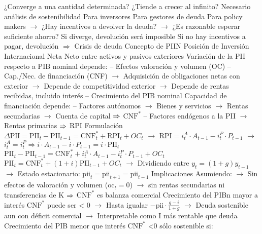 \documentclass{nuevotema}
\begin{document}
\begin{esquemal}
				\4[] ¿Converge a una cantidad determinada?
				\4[] ¿Tiende a crecer al infinito?
				\4 Necesario análisis de sostenibilidad
				\4[] Para inversores
				\4[] Para gestores de deuda
				\4[] Para policy makers
				\4[] $\to$ ¿Hay incentivos a devolver la deuda?
				\4[] $\to$ ¿Es razonable esperar suficiente ahorro?
				\4[] Si diverge, devolución será imposible
				\4[] Si no hay incentivos a pagar, devolución
				\4[] $\Rightarrow$ Crisis de deuda
				\4 Concepto de PIIN
				\4[] Posición de Inversión Internacional Neta
				\4[] Neto entre activos y pasivos exteriores
				\4 Variación de la PII respecto a PIB nominal depende:
				\4[] -- Efectos valoración y volumen (OC)
				\4[] -- Cap./Nec. de financiación (CNF)
				\4[] $\to$ Adquisición de obligaciones netas con exterior
				\4[] $\to$ Depende de competitividad exterior
				\4[] $\to$ Depende de rentas recibidas, incluido interés
				\4[] -- Crecimiento del PIB nominal
				\4 Capacidad de financiación depende:
				\4[] -- Factores autónomos
				\4[] $\to$ Bienes y servicios
				\4[] $\to$ Rentas secundarias
				\4[] $\to$ Cuenta de capital
				\4[] $\Rightarrow$ $\text{CNF}^*$
				\4[] -- Factores endógenos a la PII
				\4[] $\to$ Rentas primarias
				\4[] $\Rightarrow$ RPI
			\3 Formulación
				\4 $\Delta \text{PII} = \text{PII}_t - \text{PII}_{t-1} = \text{CNF}^*_t + \text{RPI}_t + OC_t$
				\4[] $\to$ $\text{RPI} =i_t^A \cdot A_{t-1} - i_t^P\cdot P_{t-1}$
				\4[] $\to$ $i_t^A = i_t^P \Rightarrow i \cdot A_{t-1} - i\cdot P_{t-1} = i \cdot \text{PII}_t$
				\4[] $\text{PII}_t - \text{PII}_{t-1} = \text{CNF}^*_t + i_t^A \cdot A_{t-1} - i_t^P\cdot P_{t-1} + OC_t $
				\4[] $\text{PII}_t = \text{CNF}^*_t + (1+i) \text{PII}_{t-1} + OC_t$
				\4[] $\to$ Dividiendo entre $y_t = (1+g) y_{t-1}$
				\4[] 
				\4[] $\to$ Estado estacionario: $\text{pii}_t = \text{pii}_{t+1} = \text{pii}_{t-1}$
				\4[] 
			\3 Implicaciones
				\4[] Asumiendo:
				\4[] $\to$ Sin efectos de valoración y volumen ($\text{oc}_t=0$)
				\4[] $\to$ sin rentas secundarias ni transferencias de K
				\4[] $\Rightarrow$ $\text{CNF}^*$ es balanza comercial
				\4 Crecimiento del PIBn mayor a interés
				\4[] $\text{CNF}^*$ puede ser < 0
				\4[] $\to$ Hasta igualar $-\text{pii} \cdot \frac{g-i}{1+g}$
				\4[] $\to$ Deuda sostenible aun con déficit comercial
				\4[] $\to$ Interpretable como I más rentable que deuda
				\4 Crecimiento del PIB menor que interés
				\4[] $\text{CNF}^*$ <0 sólo sostenible si:

\end{esquemal}
\end{document}

